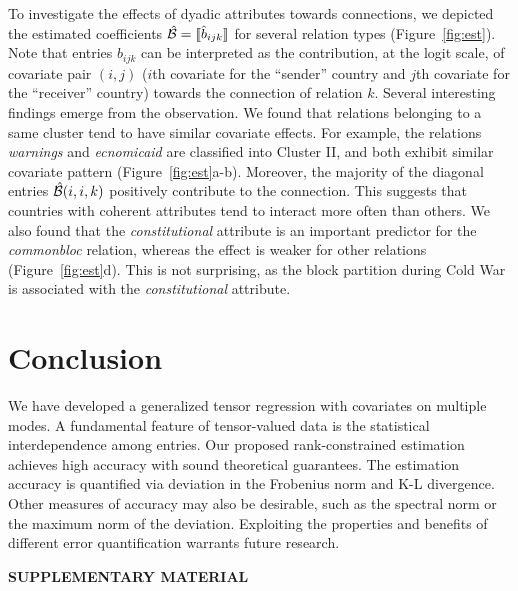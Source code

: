 \documentclass[12pt]{article}
\theoremstyle{plain}
\theoremstyle{definition}
\begin{document}
To investigate the effects of dyadic attributes towards connections, we depicted the estimated coefficients $\hat {\mathcal{B}}=\llbracket \hat b_{ijk} \rrbracket$ for several relation types (Figure~\ref{fig:est}). Note that entries $\hat b_{ijk}$ can be interpreted as the contribution, at the logit scale, of covariate pair $(i,j)$ ($i$th covariate for the ``sender'' country and $j$th covariate for the ``receiver'' country) towards the connection of relation $k$.  Several interesting findings emerge from the observation. We found that relations belonging to a same cluster tend to have similar covariate effects. For example, the relations \emph{warnings} and \emph{ecnomicaid} are classified into Cluster II, and both exhibit similar covariate pattern (Figure~\ref{fig:est}a-b). Moreover, the majority of the diagonal entries $\hat {\mathcal{B}}(i,i,k)$ positively contribute to the connection. This suggests that countries with coherent attributes tend to interact more often than others. We also found that the \emph{constitutional} attribute is an important predictor for the \emph{commonbloc} relation, whereas the effect is weaker for other relations (Figure~\ref{fig:est}d). This is not surprising, as the block partition during Cold War is associated with the \emph{constitutional} attribute. 


\section{Conclusion}

 We have developed a generalized tensor regression with covariates on multiple modes. A fundamental feature of tensor-valued data is the statistical interdependence among entries. Our proposed rank-constrained estimation achieves high accuracy with sound theoretical guarantees. The estimation accuracy is quantified via deviation in the Frobenius norm and K-L divergence. Other measures of accuracy may also be desirable, such as the spectral norm or the maximum norm of the deviation. Exploiting the properties and benefits of different error quantification warrants future research.
 
 \newpage

\bigskip
\begin{center}
{\large\bf SUPPLEMENTARY MATERIAL}
\end{center}

\appendix
\end{document}
